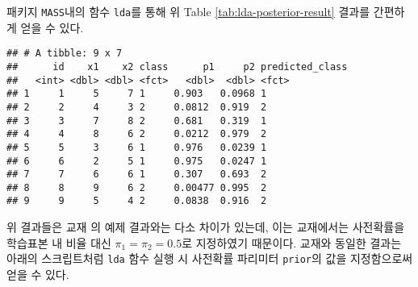 \documentclass[
]{book}
\newenvironment{Shaded}{\begin{snugshade}}{\end{snugshade}}
\newcommand{\AttributeTok}[1]{\textcolor[rgb]{0.77,0.63,0.00}{#1}}
\newcommand{\FunctionTok}[1]{\textcolor[rgb]{0.00,0.00,0.00}{#1}}
\newcommand{\NormalTok}[1]{#1}
\newcommand{\OtherTok}[1]{\textcolor[rgb]{0.56,0.35,0.01}{#1}}
\newcommand{\SpecialCharTok}[1]{\textcolor[rgb]{0.00,0.00,0.00}{#1}}
\newcommand{\StringTok}[1]{\textcolor[rgb]{0.31,0.60,0.02}{#1}}
\begin{document}
패키지 \texttt{MASS}내의 함수 \texttt{lda}를 통해 위 Table \ref{tab:lda-posterior-result} 결과를 간편하게 얻을 수 있다.

\begin{Shaded}
\end{Shaded}

\begin{verbatim}
## # A tibble: 9 x 7
##      id    x1    x2 class      p1     p2 predicted_class
##   <int> <dbl> <dbl> <fct>   <dbl>  <dbl> <fct>          
## 1     1     5     7 1     0.903   0.0968 1              
## 2     2     4     3 2     0.0812  0.919  2              
## 3     3     7     8 2     0.681   0.319  1              
## 4     4     8     6 2     0.0212  0.979  2              
## 5     5     3     6 1     0.976   0.0239 1              
## 6     6     2     5 1     0.975   0.0247 1              
## 7     7     6     6 1     0.307   0.693  2              
## 8     8     9     6 2     0.00477 0.995  2              
## 9     9     5     4 2     0.0838  0.916  2
\end{verbatim}

위 결과들은 교재 \citep{jun2012datamining}의 예제 결과와는 다소 차이가 있는데, 이는 교재에서는 사전확률을 학습표본 내 비율 대신 \(\pi_1 = \pi_2 = 0.5\)로 지정하였기 때문이다. 교재와 동일한 결과는 아래의 스크립트처럼 \texttt{lda} 함수 실행 시 사전확률 파리미터 \texttt{prior}의 값을 지정함으로써 얻을 수 있다.
\end{document}
